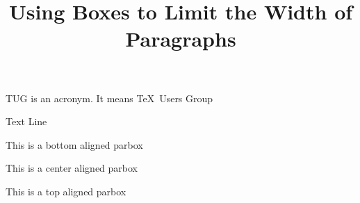 \documentclass{article}
\title{Using Boxes to Limit the Width of Paragraphs}
\begin{document}
\parbox{3cm}{TUG is an acronym. It means \TeX\ Users Group}	


\bigskip
\bigskip
\bigskip
Text Line
\quad
\parbox[b]{1.8cm}{This is a bottom aligned parbox}
\quad
\parbox{1.5cm}{This is a center aligned parbox}
\qquad
\parbox[t]{2cm}{This is a top aligned parbox}
\end{document}
